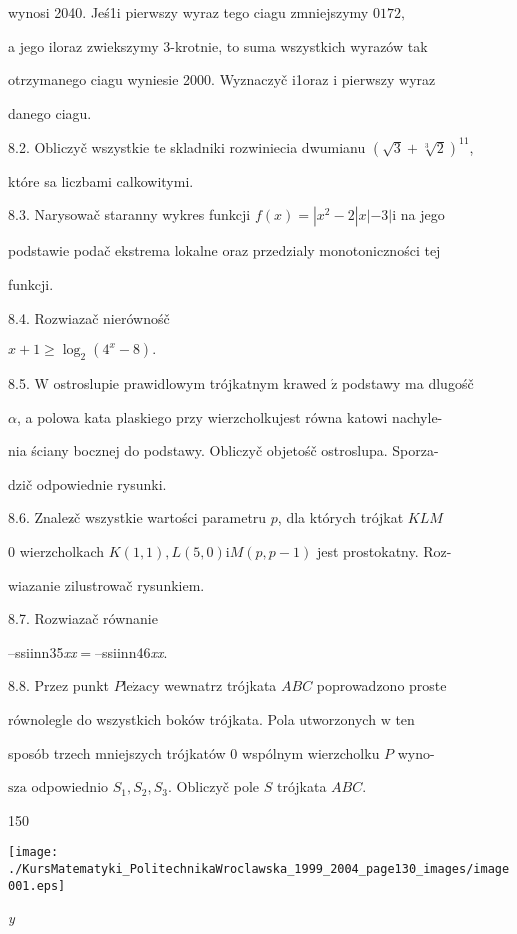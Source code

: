 \documentclass[a4paper,12pt]{article}
\begin{document}
wynosi 2040. Jeś1i pierwszy wyraz tego ciagu zmniejszymy $0 172,$

a jego iloraz zwiekszymy 3-krotnie, to suma wszystkich wyrazów tak

otrzymanego ciagu wyniesie 2000. Wyznaczyč i1oraz $\mathrm{i}$ pierwszy wyraz

danego ciagu.

8.2. Obliczyč wszystkie te skladniki rozwiniecia dwumianu $(\sqrt{3}+\sqrt[3]{2})^{11}$,

które sa liczbami calkowitymi.

8.3. Narysowač staranny wykres funkcji $f(x) = |x^{2}-2|x|-3| \mathrm{i}$ na jego

podstawie podač ekstrema lokalne oraz przedzialy monotoniczności tej

funkcji.

8.4. Rozwiazač nierównośč

$x+1\geq\log_{2}(4^{x}-8).$

8.5. $\mathrm{W}$ ostroslupie prawidlowym trójkatnym krawed $\acute{\mathrm{z}}$ podstawy ma dlugośč

$\alpha$, a polowa kata plaskiego przy wierzcholkujest równa katowi nachyle-

nia ściany bocznej do podstawy. Obliczyč objetośč ostroslupa. Sporza-

dzič odpowiednie rysunki.

8.6. Znalez$\acute{}$č wszystkie wartości parametru $p$, dla których trójkat $KLM$

$0$ wierzcholkach $K(1,1), L(5,0)\mathrm{i}M(p,p-1)$ jest prostokatny. Roz-

wiazanie zilustrowač rysunkiem.

8.7. Rozwiazač równanie

--ssiinn35{\it xx}$=$--ssiinn46{\it xx}.

8.8. Przez punkt $P\mathrm{l}\mathrm{e}\dot{\mathrm{z}}\mathrm{a}\mathrm{c}\mathrm{y}$ wewnatrz trójkata $ABC$ poprowadzono proste

równolegle do wszystkich boków trójkata. Pola utworzonych $\mathrm{w}$ ten

sposób trzech mniejszych trójkatów $0$ wspólnym wierzcholku $P$ wyno-

$\mathrm{s}\mathrm{z}\mathrm{a}$ odpowiednio $S_{1}, S_{2}, S_{3}$. Obliczyč pole $S$ trójkata $ABC.$





150
\begin{center}
\texttt{[image: ./KursMatematyki\_PolitechnikaWroclawska\_1999\_2004\_page130\_images/image001.eps]}
\end{center}
{\it y}
\end{document}

